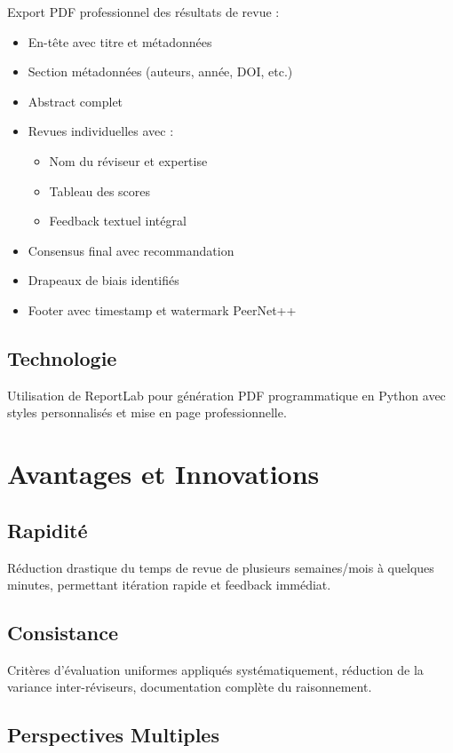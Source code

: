 \documentclass[12pt,a4paper]{article}
\begin{document}
Export PDF professionnel des résultats de revue :
\begin{itemize}
    \item En-tête avec titre et métadonnées
    \item Section métadonnées (auteurs, année, DOI, etc.)
    \item Abstract complet
    \item Revues individuelles avec :
    \begin{itemize}
        \item Nom du réviseur et expertise
        \item Tableau des scores
        \item Feedback textuel intégral
    \end{itemize}
    \item Consensus final avec recommandation
    \item Drapeaux de biais identifiés
    \item Footer avec timestamp et watermark PeerNet++
\end{itemize}

\subsection{Technologie}

Utilisation de ReportLab pour génération PDF programmatique en Python avec styles personnalisés et mise en page professionnelle.

\section{Avantages et Innovations}

\subsection{Rapidité}

Réduction drastique du temps de revue de plusieurs semaines/mois à quelques minutes, permettant itération rapide et feedback immédiat.

\subsection{Consistance}

Critères d'évaluation uniformes appliqués systématiquement, réduction de la variance inter-réviseurs, documentation complète du raisonnement.

\subsection{Perspectives Multiples}
\end{document}

